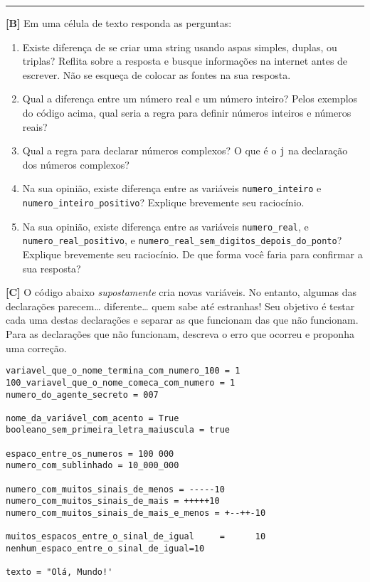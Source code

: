 \documentclass[11pt]{article}
\begin{document}
\par\noindent\rule{\textwidth}{0.4pt}

\textbf{[B]} Em uma célula de texto responda as perguntas:

\begin{enumerate}
\item Existe diferença de se criar uma string usando aspas simples, duplas, ou triplas? Reflita sobre a resposta e busque informações na internet antes de escrever. Não se esqueça de colocar as fontes na sua resposta.
\item Qual a diferença entre um número real e um número inteiro? Pelos exemplos do código acima, qual seria a regra para definir números inteiros e números reais?
\item Qual a regra para declarar números complexos? O que é o \texttt{j} na declaração dos números complexos?
\item Na sua opinião, existe diferença entre as variáveis \texttt{numero\_inteiro} e \texttt{numero\_inteiro\_positivo}? Explique brevemente seu raciocínio.
\item Na sua opinião, existe diferença entre as variáveis \texttt{numero\_real}, e \texttt{numero\_real\_positivo}, e \texttt{numero\_real\_sem\_digitos\_depois\_do\_ponto}? Explique brevemente seu raciocínio. De que forma você faria para confirmar a sua resposta?
\end{enumerate}

\textbf{[C]} O código abaixo \emph{supostamente} cria novas variáveis. No entanto, algumas das declarações parecem\ldots{} diferente\ldots{} quem sabe até estranhas! Seu objetivo é testar cada uma destas declarações e separar as que funcionam das que não funcionam. Para as declarações que não funcionam, descreva o erro que ocorreu e proponha uma correção.

\begin{verbatim}
variavel_que_o_nome_termina_com_numero_100 = 1
100_variavel_que_o_nome_comeca_com_numero = 1
numero_do_agente_secreto = 007

nome_da_variável_com_acento = True
booleano_sem_primeira_letra_maiuscula = true

espaco_entre_os_numeros = 100 000
numero_com_sublinhado = 10_000_000

numero_com_muitos_sinais_de_menos = -----10
numero_com_muitos_sinais_de_mais = +++++10
numero_com_muitos_sinais_de_mais_e_menos = +--++-10

muitos_espacos_entre_o_sinal_de_igual     =      10
nenhum_espaco_entre_o_sinal_de_igual=10

texto = "Olá, Mundo!'
\end{verbatim}
\end{document}
